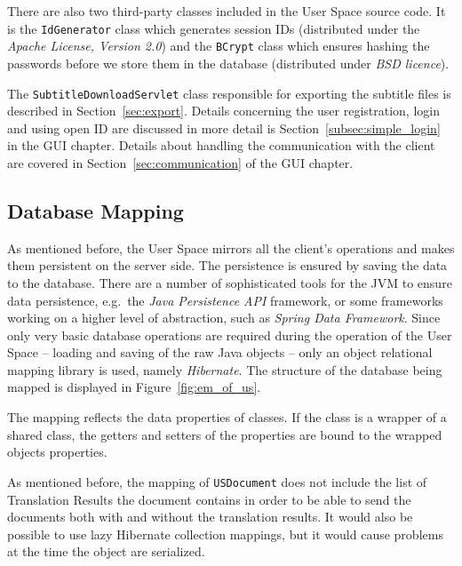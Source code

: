 There are also two third-party classes included in the User Space source code. It is the {\tt IdGenerator} class which generates session IDs (distributed under the {\it Apache License, Version 2.0}) and the {\tt BCrypt} class which ensures hashing the passwords before we store them in the database (distributed under {\it BSD licence}).

The {\tt SubtitleDownloadServlet} class responsible for exporting the subtitle files is described in Section~\ref{sec:export}. Details concerning the user registration, login and using open ID are discussed in more detail is Section~\ref{subsec:simple_login} in the GUI chapter. Details about handling the communication with the client are covered in Section~\ref{sec:communication} of the GUI chapter.

\subsection{Database Mapping}
\label{subsec:database_mapping}

As mentioned before, the User Space mirrors all the client's operations and makes them persistent on the server side. The persistence is ensured by saving the data to the database. There are a number of sophisticated tools for the JVM to ensure data persistence, e.g.\ the \emph{Java Persistence API} framework, or some frameworks working on a higher level of abstraction, such as \emph{Spring Data Framework}. Since only very basic database operations are required during the operation of the User Space -- loading and saving of the raw Java objects -- only an object relational mapping library is used, namely \emph{Hibernate}. The structure of the database being mapped is displayed in Figure~\ref{fig:em_of_us}.

The mapping reflects the data properties of classes. If the class is a wrapper of a shared class, the getters and setters of the properties are bound to the wrapped objects properties.

As mentioned before, the mapping of {\tt USDocument} does not include the list of Translation Results the document contains in order to be able to send the documents both with and without the translation results. It would also be possible to use lazy Hibernate collection mappings, but it would cause problems at the time the object are serialized.

